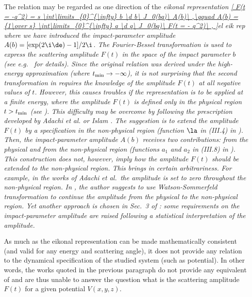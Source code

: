 The relation  may be regarded as one direction of the \em{eikonal representation}
\eqref{
	F(t = -q^2) = s \int\limits_{0}^{\infty} b \d b\ J_0(bq)\ A(b)\ ,\qquad
	A(b) = {1\over s} \int\limits_{0}^{\infty} q \d q\ J_0(bq)\ F(t = - q^2)\ ,
}{el eik rep}
where we have introduced the \em{impact-parameter amplitude} $A(b) = [\exp(2\i\de) - 1] / 2\i$.  The Fourier-Bessel transformation is used to express the scattering amplitude $F(t)$ in the space of the impact parameter $b$ (see e.g.~ for details). Since the original relation  was derived under the high-energy approximation (where $t_{\rm min} \to -\infty$), it is not surprising that the second transformation in  requires the knowledge of the amplitude $F(t)$ at all negative values of $t$. However, this causes troubles if the representation is to be applied at a finite energy, where the amplitude $F(t)$ is defined only in the physical region $t > t_{\rm min}$ (see ). This difficulty may be overcome by following the prescription developed by Adachi et al.  or Islam . The suggestion is to extend the amplitude $F(t)$ by a specification in the non-physical region (function $\la$ in (III.4) in ). Then, the impact-parameter amplitude $A(b)$ receives two contributions: from the physical and from the non-physical region (functions $a_1$ and $a_2$ in (III.8) in ). This construction does not, however, imply how the amplitude $F(t)$ should be extended to the non-physical region. This brings in certain arbitrariness. For example, in the works of Adachi et al.~the amplitude is set to zero throughout the non-physical region. In , the author suggests to use Watson-Sommerfeld transformation to continue the amplitude from the physical to the non-physical region. Yet another approach is chosen in Sec.~3 of : some requirements on the impact-parameter amplitude are raised following a statistical interpretation of the amplitude.

As much as the eikonal representation  can be made mathematically consistent (and valid for any energy and scattering angle), it does not provide any relation to the dynamical specification of the studied system (such as potential). In other words, the works quoted in the previous paragraph do not provide any equivalent of  and are thus unable to answer the question what is the scattering amplitude $F(t)$ for a given potential $V(x, y, z)$.

